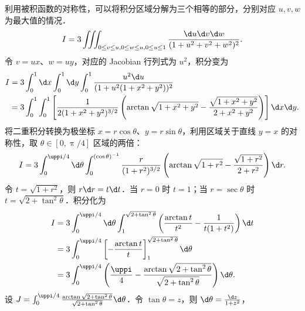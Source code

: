 \begin{solution}
    利用被积函数的对称性，可以将积分区域分解为三个相等的部分，分别对应 $u, v, w$ 为最大值的情况．
    \begin{equation}
        I = 3 \iiint_{0 \le v \le u, 0 \le w \le u, 0 \le u \le 1} \frac{\d u \d v \d w}{(1 + u^2 + v^2 + w^2)^2}.
    \end{equation}
    令 $v = ux$、$w = uy$，对应的 Jacobian 行列式为 $u^2$，积分变为
    \begin{equation}
        \begin{aligned}
            I & = 3 \int_0^1 \d x \int_0^1 \d y \int_0^1 \frac{u^2 \d u}{(1 + u^2(1 + x^2 + y^2))^2}                                                                      \\
              & = 3 \int_0^1 \int_0^1 \left[ \frac{1}{2(1+x^2+y^2)^{3/2}} \left( \arctan \sqrt{1+x^2+y^2} - \frac{\sqrt{1+x^2+y^2}}{2+x^2+y^2} \right) \right] \d x \d y.
        \end{aligned}
    \end{equation}
    将二重积分转换为极坐标 $x = r \cos \theta$、$y = r \sin \theta$，利用区域关于直线 $y = x$ 的对称性，取 $\theta \in [0, \uppi/4]$ 区域的两倍：
    \begin{equation}
        I = 3 \int_0^{\uppi/4} \d \theta \int_0^{( \cos \theta )^{-1}} \frac{r}{(1+r^2)^{3/2}} \left( \arctan \sqrt{1+r^2} - \frac{\sqrt{1+r^2}}{2+r^2} \right) \d r.
    \end{equation}
    令 $t = \sqrt{1+r^2}$，则 $r \d r = t \d t$．当 $r = 0$ 时 $t = 1$；当 $r = \sec \theta$ 时 $t = \sqrt{2 + \tan^2 \theta}$．积分化为
    \begin{equation}
        \begin{aligned}
            I & = 3 \int_0^{\uppi/4} \d \theta \int_1^{\sqrt{2 + \tan^2 \theta}} \left( \frac{\arctan t}{t^2} - \frac{1}{t(1+t^2)} \right) \d t    \\
              & = 3 \int_0^{\uppi/4} \left[ -\frac{\arctan t}{t} \right]_1^{\sqrt{2 + \tan^2 \theta}} \d \theta                                    \\
              & = 3 \int_0^{\uppi/4} \left( \frac{\uppi}{4} - \frac{\arctan \sqrt{2 + \tan^2 \theta}}{\sqrt{2 + \tan^2 \theta}} \right) \d \theta.
        \end{aligned}
    \end{equation}
    设 $J = \int_0^{\uppi/4} \frac{\arctan \sqrt{2 + \tan^2 \theta}}{\sqrt{2 + \tan^2 \theta}} \d \theta$．令 $\tan \theta = z$，则 $\d \theta = \frac{\d z}{1+z^2}$，
    \begin{equation}

\end{equation}
\end{solution}
